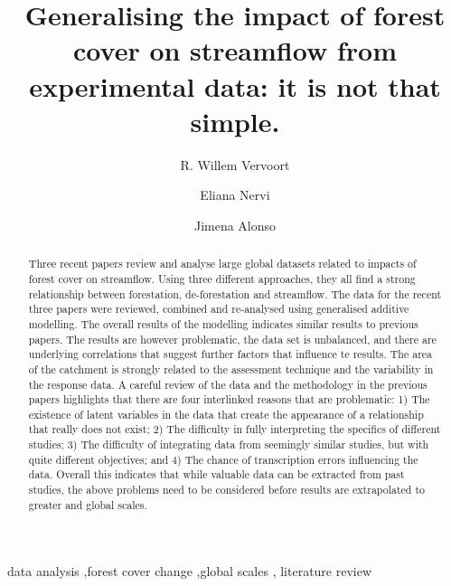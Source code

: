 \documentclass[]{elsarticle} %
\begin{document}
\begin{frontmatter}

  \title{Generalising the impact of forest cover on streamflow from experimental data: it is not that simple.}
    \author[a,b]{R. Willem Vervoort}
    \author[c]{Eliana Nervi}
    \author[d]{Jimena Alonso}
  
  \begin{abstract}
  Three recent papers review and analyse large global datasets related to impacts of forest cover on streamflow. Using three different approaches, they all find a strong relationship between forestation, de-forestation and streamflow. The data for the recent three papers were reviewed, combined and re-analysed using generalised additive modelling. The overall results of the modelling indicates similar results to previous papers. The results are however problematic, the data set is unbalanced, and there are underlying correlations that suggest further factors that influence te results. The area of the catchment is strongly related to the assessment technique and the variability in the response data.
  A careful review of the data and the methodology in the previous papers highlights that there are four interlinked reasons that are problematic: 1) The existence of latent variables in the data that create the appearance of a relationship that really does not exist; 2) The difficulty in fully interpreting the specifics of different studies; 3) The difficulty of integrating data from seemingly similar studies, but with quite different objectives; and 4) The chance of transcription errors influencing the data. Overall this indicates that while valuable data can be extracted from past studies, the above problems need to be considered before results are extrapolated to greater and global scales.
  \end{abstract}
    \begin{keyword}
    data analysis \sep forest cover change \sep global scales \sep 
    literature review
  \end{keyword}
  
 \end{frontmatter}
\end{document}
